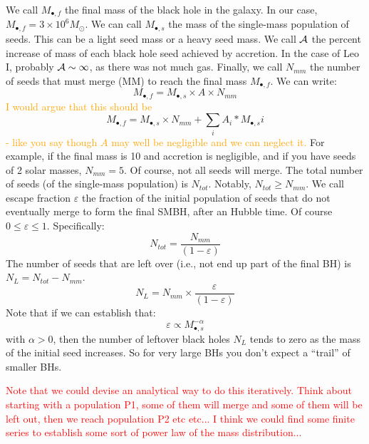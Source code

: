 \documentclass[twocolumn, tighten]{aastex631}
\begin{document}
We call $M_{\bullet, f}$ the final mass of the black hole in the galaxy. In our case, $M_{\bullet, f} = 3\times 10^6 M_\odot$. We can call $M_{\bullet, s}$ the mass of the single-mass population of seeds. This can be a light seed mass or a heavy seed mass. We call $\cal{A}$ the percent increase of mass of each black hole seed achieved by accretion. In the case of Leo I, probably $\cal{A} \sim 1$, as there was not much gas. Finally, we call $N_{mm}$ the number of seeds that must merge (MM) to reach the final mass $M_{\bullet, f}$. We can write:
\begin{equation}
    M_{\bullet, f} = M_{\bullet, s} \times A \times N_{mm}
\end{equation}
\textcolor{orange}{I would argue that this should be}
\begin{equation*}
    M_{\bullet, f} = M_{\bullet, s} \times N_{mm} + \sum_i A_i * M_{\bullet, s}i
\end{equation*}
\textcolor{orange}{- like you say though $A$ may well be negligible and we can neglect it. }
For example, if the final mass is 10 and accretion is negligible, and if you have seeds of 2 solar masses, $N_{mm} = 5$.
Of course, not all seeds will merge. The total number of seeds (of the single-mass population) is $N_{tot}$. Notably, $N_{tot} \geq N_{mm}$.
We call escape fraction $\varepsilon$ the fraction of the initial population of seeds that do not eventually merge to form the final SMBH, after an Hubble time. Of course $0 \leq \varepsilon \leq 1$. Specifically:
\begin{equation}
    N_{tot} = \frac{N_{mm}}{(1-\varepsilon)}
\end{equation}
The number of seeds that are left over (i.e., not end up part of the final BH) is $N_L = N_{tot} - N_{mm}$.
\begin{equation}
    N_L = N_{mm} \times \frac{\varepsilon}{(1-\varepsilon)}
\end{equation}
Note that if we can establish that:
\begin{equation}
    \varepsilon \propto M_{\bullet, s}^{-\alpha}
\end{equation}
with $\alpha > 0$, then the number of leftover black holes $N_L$ tends to zero as the mass of the initial seed increases.
So for very large BHs you don't expect a ``trail'' of smaller BHs.

\textcolor{red}{Note that we could devise an analytical way to do this iteratively. Think about starting with a population P1, some of them will merge and some of them will be left out, then we reach population P2 etc etc... I think we could find some finite series to establish some sort of power law of the mass distribution...}
\end{document}
